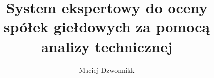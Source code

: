 \documentclass[a4paper,12pt,twoside]{book}
\author{Maciej Dzwonnikk}
\title{System ekspertowy do oceny spółek giełdowych za pomocą analizy technicznej}
\begin{document}
\frontmatter

\tableofcontents

\mainmatter
\pagestyle{headings}


%







\appendix
\renewcommand{\chaptermark}[1]{%
\markboth{\MakeUppercase{%
DODATEK \thechapter.%
\ }}{}}
%

\end{document}
